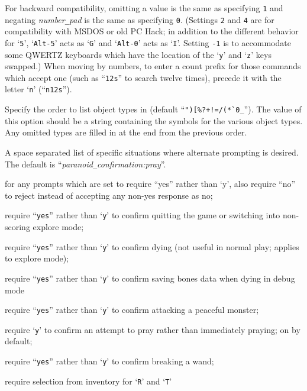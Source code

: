 For backward compatibility, omitting a value is the same as specifying {\tt 1}
and negating
{\it number\verb+_+pad\/}
is the same as specifying {\tt 0}.
(Settings {\tt 2} and {\tt 4} are for compatibility with MSDOS or old PC Hack;
in addition to the different behavior for `{\tt 5}', `{\tt Alt-5}' acts as `{\tt G}'
and `{\tt Alt-0}' acts as `{\tt I}'.
Setting {\tt -1} is to accommodate some QWERTZ keyboards which have the
location of the `{\tt y}' and `{\tt z}' keys swapped.)
When moving by numbers, to enter a count prefix for those commands
which accept one (such as ``{\tt 12s}'' to search twelve times), precede it
with the letter `{\tt n}' (``{\tt n12s}'').
\item[\ib{packorder}]
Specify the order to list object types in (default
``\verb&")[%?+!=/(*`0_&''). The value of this option should be a string
containing the symbols for the various object types.  Any omitted types
are filled in at the end from the previous order.
\item[\ib{paranoid\verb+_+confirmation}]
A space separated list of specific situations where alternate
prompting is desired.  The default is ``{\it paranoid\verb+_+confirmation:pray}''.
\newlength{\pcwidth}
\settowidth{\pcwidth}{\tt Confirm}
\addtolength{\pcwidth}{\labelsep}
\blist{\leftmargin \pcwidth \topsep 1mm \itemsep 0mm}
\item[{\tt Confirm}]
for any prompts which are set to require ``yes''
rather than `y', also require ``no'' to reject instead
of accepting any non-yes response as no;
\item[{\tt quit~~~}]
require ``{\tt yes}'' rather than `{\tt y}' to confirm quitting
the game or switching into non-scoring explore mode;
\item[{\tt die~~~~}]
require ``{\tt yes}'' rather than `{\tt y}' to confirm dying (not
useful in normal play; applies to explore mode);
\item[{\tt bones~~}]
require ``{\tt yes}'' rather than `{\tt y}' to confirm saving
bones data when dying in debug mode
\item[{\tt attack~}]
require ``{\tt yes}'' rather than `{\tt y}' to confirm attacking
a peaceful monster;
\item[{\tt pray~~~}]
require `{\tt y}' to confirm an attempt to pray rather
than immediately praying; on by default;
\item[{\tt wand}]
require ``{\tt yes}'' rather than `{\tt y}' to confirm breaking
a wand;
\item[{\tt Remove~}] require selection from inventory for `{\tt R}' and `{\tt T}'
